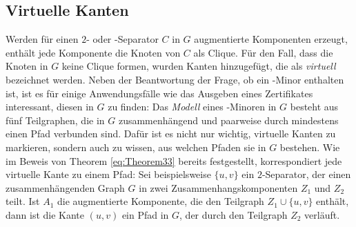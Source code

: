 \subsection{Virtuelle Kanten}
Werden für einen $2$- oder \dd-Separator $C$ in $G$ augmentierte Komponenten erzeugt, enthält jede Komponente die Knoten von $C$ als Clique.
Für den Fall, dass die Knoten in $G$ keine Clique formen, wurden Kanten hinzugefügt, die als \emph{virtuell} bezeichnet werden.
Neben der Beantwortung der Frage, ob ein \kf-Minor enthalten ist, ist es für einige Anwendungsfälle wie das Ausgeben eines Zertifikates interessant, diesen in $G$ zu finden:
Das \emph{Modell} eines \kf-Minoren in $G$ besteht aus fünf Teilgraphen, die in $G$ zusammenhängend und paarweise durch mindestens einen Pfad verbunden sind.
Dafür ist es nicht nur wichtig, virtuelle Kanten zu markieren, sondern auch zu wissen, aus welchen Pfaden sie in $G$ bestehen.
Wie im Beweis von Theorem \ref{eq:Theorem33} bereits festgestellt, korrespondiert jede virtuelle Kante zu einem Pfad:
Sei beispielsweise $\{u, v\}$ ein $2$-Separator, der einen zusammenhängenden Graph $G$ in zwei Zusammenhangskomponenten $Z_1$ und $Z_2$ teilt.
Ist $A_1$ die augmentierte Komponente, die den Teilgraph $Z_1 \cup \{u, v\}$ enthält, dann ist die Kante $(u, v)$ ein Pfad in $G$, der durch den Teilgraph $Z_2$ verläuft.

